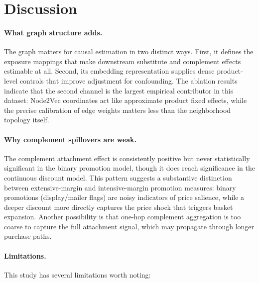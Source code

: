 \documentclass[conference]{IEEEtran}
\begin{document}
\section{Discussion}

\paragraph{What graph structure adds.}
The graph matters for causal estimation in two distinct ways.
First, it defines the exposure mappings that make downstream substitute and
complement effects estimable at all.
Second, its embedding representation supplies dense product-level controls
that improve adjustment for confounding.
The ablation results indicate that the second channel is the largest
empirical contributor in this dataset: Node2Vec coordinates act like
approximate product fixed effects, while the precise calibration of edge
weights matters less than the neighborhood topology itself.

\paragraph{Why complement spillovers are weak.}
The complement attachment effect is consistently positive but never
statistically significant in the binary promotion model, though it does
reach significance in the continuous discount model.
This pattern suggests a substantive distinction between extensive-margin and
intensive-margin promotion measures: binary promotions (display/mailer flags)
are noisy indicators of price salience, while a deeper discount more directly
captures the price shock that triggers basket expansion.
Another possibility is that one-hop complement aggregation is too coarse
to capture the full attachment signal, which may propagate through longer
purchase paths.

\paragraph{Limitations.}
This study has several limitations worth noting:
\end{document}
